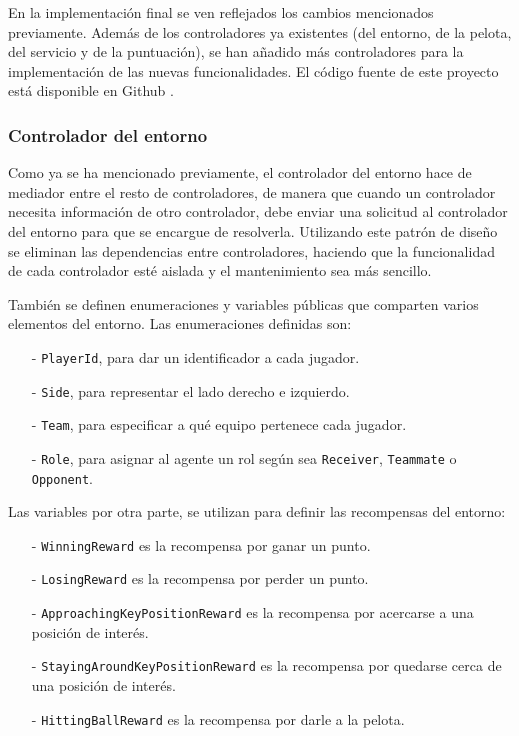 En la implementación final se ven reflejados los cambios mencionados previamente. Además de los controladores ya existentes (del entorno, de la pelota, del servicio y de la puntuación), se han añadido más controladores para la implementación de las nuevas funcionalidades. El código fuente de este proyecto está disponible en Github \cite{padel-project}.

\subsubsection{Controlador del entorno}

Como ya se ha mencionado previamente, el controlador del entorno hace de mediador entre el resto de controladores, de manera que cuando un controlador necesita información de otro controlador, debe enviar una solicitud al controlador del entorno para que se encargue de resolverla. Utilizando este patrón de diseño se eliminan las dependencias entre controladores, haciendo que la funcionalidad de cada controlador esté aislada y el mantenimiento sea más sencillo.

También se definen enumeraciones y variables públicas que comparten varios elementos del entorno. Las enumeraciones definidas son:
\begin{enumerate}
    \item[-] \texttt{PlayerId}, para dar un identificador a cada jugador.
    \item[-] \texttt{Side}, para representar el lado derecho e izquierdo.
    \item[-] \texttt{Team}, para especificar a qué equipo pertenece cada jugador.
    \item[-] \texttt{Role}, para asignar al agente un rol según sea \texttt{Receiver}, \texttt{Teammate} o \texttt{Opponent}.
\end{enumerate}
Las variables por otra parte, se utilizan para definir las recompensas del entorno:
\begin{enumerate}
    \item[-] \texttt{WinningReward} es la recompensa por ganar un punto.
    \item[-] \texttt{LosingReward} es la recompensa por perder un punto.
    \item[-] \texttt{ApproachingKeyPositionReward} es la recompensa por acercarse a una posición de interés.
    \item[-] \texttt{StayingAroundKeyPositionReward} es la recompensa por quedarse cerca de una posición de interés.
    \item[-] \texttt{HittingBallReward} es la recompensa por darle a la pelota.
\end{enumerate}

